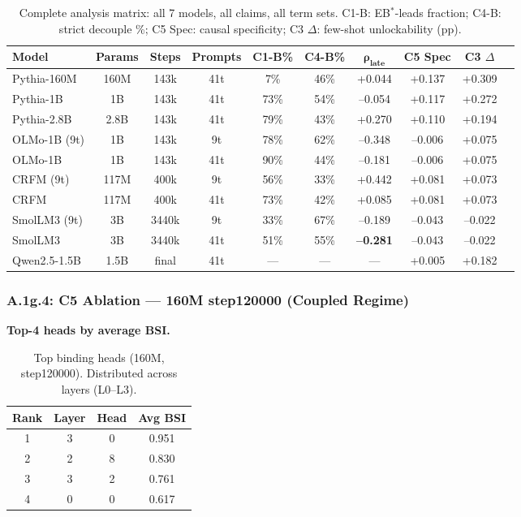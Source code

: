 \documentclass[10pt]{article} %
\begin{document}
\begin{table}[H]
\centering
\scriptsize
\begin{tabular}{|l|c|c|c|c|c|c|c|c|c|}
\hline
\textbf{Model} & \textbf{Params} & \textbf{Steps} & \textbf{Prompts} & \textbf{C1-B\%} & \textbf{C4-B\%} & $\mathbf{\rho_{\text{late}}}$ & \textbf{C5 Spec} & \textbf{C3 $\Delta$} \\
\hline
Pythia-160M & 160M & 143k & 41t & 7\% & 46\% & +0.044 & +0.137 & +0.309 \\
Pythia-1B & 1B & 143k & 41t & 73\% & 54\% & --0.054 & +0.117 & +0.272 \\
Pythia-2.8B & 2.8B & 143k & 41t & 79\% & 43\% & +0.270 & +0.110 & +0.194 \\
OLMo-1B (9t) & 1B & 143k & 9t & 78\% & 62\% & --0.348 & --0.006 & +0.075 \\
OLMo-1B & 1B & 143k & 41t & 90\% & 44\% & --0.181 & --0.006 & +0.075 \\
CRFM (9t) & 117M & 400k & 9t & 56\% & 33\% & +0.442 & +0.081 & +0.073 \\
CRFM & 117M & 400k & 41t & 73\% & 42\% & +0.085 & +0.081 & +0.073 \\
SmolLM3 (9t) & 3B & 3440k & 9t & 33\% & 67\% & --0.189 & --0.043 & --0.022 \\
SmolLM3 & 3B & 3440k & 41t & 51\% & 55\% & \textbf{--0.281} & --0.043 & --0.022 \\
Qwen2.5-1.5B & 1.5B & final & 41t & --- & --- & --- & +0.005 & +0.182 \\
\hline
\end{tabular}
\caption{Complete analysis matrix: all 7 models, all claims, all term sets. C1-B: EB$^*$-leads fraction; C4-B: strict decouple \%; C5 Spec: causal specificity; C3 $\Delta$: few-shot unlockability (pp).}
\label{tab:full_matrix}
\end{table}

\subsubsection*{A.1g.4: C5 Ablation --- 160M step120000 (Coupled Regime)}\label{sec:a1g4_160m}

\noindent\textbf{Top-4 heads by average BSI.}\mbox{}

\begin{table}[ht]
\centering
\small
\begin{tabular}{|c|c|c|c|}
\hline
\textbf{Rank} & \textbf{Layer} & \textbf{Head} & \textbf{Avg BSI} \\
\hline
1 & 3 & 0 & 0.951 \\
2 & 2 & 8 & 0.830 \\
3 & 3 & 2 & 0.761 \\
4 & 0 & 0 & 0.617 \\
\hline
\end{tabular}
\caption{Top binding heads (160M, step120000). Distributed across layers (L0--L3).}
\end{table}
\end{document}
